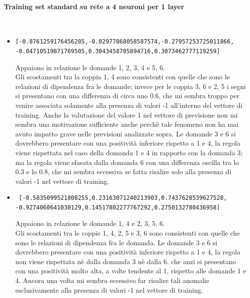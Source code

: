 \paragraph{Training set standard su rete a 4 neuroni per 1 layer}\mbox{}
\label{Training set standard su rete a 4 neuroni per 1 layer}
\\
\noindent
\begin{itemize}
\item \begin{verbatim}[-0.8761259176456285,-0.02977868058587574,-0.27957253725011866,
-0.04710519871769505,0.3043458705894716,0.3073462777119259]
\end{verbatim}
Appaiono in relazione le domande 1, 2, 3, 4  e 5, 6.\\
Gli scostamenti tra la coppia 1, 4 sono consistenti con quelle che sono le relazioni di dipendenza fra le domande; invece per le coppia 3, 6 e 2, 5 i segni si presentano con una differenza di circa uno 0.6, che mi sembra troppo per venire associata solamente alla presenza di valori -1 all'interno del vettore di training. Anche la valutazione del valore 1 nel vettore di previsione non mi sembra una motivazione sufficiente anche perch\`e tale fenomeno non ha mai avuto impatto grave nelle previsioni analizzate sopra.
Le domande 3 e 6 si dovrebbero presentare con una positivit\`a inferiore rispetto a 1 e 4, la regola viene rispettata nel caso della domanda 1 e 4 in rapporto con la domanda 3; ma la regola viene sfasata dalla domanda 6 con una differenza oscilla tra lo 0.3 e lo 0.8, che mi sembra eccessiva se fatta risalire solo alla presenza di valori -1 nel vettore di training.

\item \begin{verbatim} [-0.5835099521808255,0.23163071240213903,0.7437628539627528,
-0.9274060641030129,0.14517802277767292,0.2750132780436958]
\end{verbatim}
Appaiono in relazione le domande 1, 4 e 2, 3, 5, 6.\\
Gli scostamenti tra le coppie 1, 4, 2, 5 e 3, 6  sono consistenti con quelle che sono le relazioni di dipendenza fra le domanda.
Le domande 3 e 6 si dovrebbero presentare con una positivit\`a inferiore rispetto a 1 e 4, la regola non viene rispettata n\`e dalla domanda 3 n\`e dalla 6. che anzi si presentano con una positivit\`a molto alta, a volte tendente al 1, rispetto alle domande 1 e 4. Ancora una volta mi sembra eccessivo far risalire tali anomalie esclusivamente alla presenza di valori -1 nel vettore di training.


\end{itemize}
